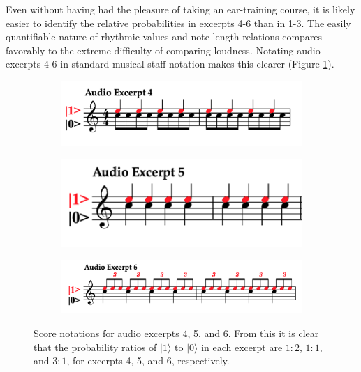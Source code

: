 \documentclass[10pt,twocolumn]{article}
\begin{document}
Even without having had the pleasure of taking an ear-training course, it is likely easier to identify the relative probabilities in excerpts 4-6 than in 1-3. The easily quantifiable nature of rhythmic values and note-length-relations compares favorably to the extreme difficulty of comparing loudness. Notating audio excerpts 4-6 in standard musical staff notation makes this clearer (Figure \ref{fig:Figure2}).

\begin{figure}[h]

        \begin{subfigure}{0.45\textwidth}
                \centering
                \includegraphics[width=\textwidth]{fig/Figure 2a.png} %
        \end{subfigure}

        \hfill

        \begin{subfigure}{0.45\textwidth}
                \centering
                \includegraphics[width=\textwidth]{fig/Figure 2b.png} %
        \end{subfigure}

        \begin{subfigure}{0.45\textwidth}
                \centering
                \includegraphics[width=\textwidth]{fig/Figure 2c.png}
        \end{subfigure}

        \caption{Score notations for audio excerpts 4, 5, and 6. From this it is clear that the probability ratios of $|1\rangle$ to $|0\rangle$ in each excerpt are $1:2$, $1:1$, and $3:1$, for excerpts 4, 5, and 6, respectively.}
        \label{fig:Figure2}
\end{figure}
\end{document}

